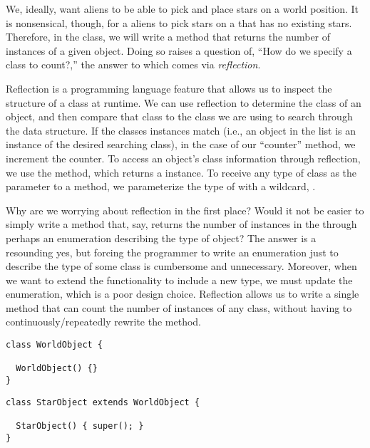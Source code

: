 We, ideally, want aliens to be able to pick and place stars on a world position. It is nonsensical, though, for a aliens to pick stars on a  that has no existing stars. Therefore, in the  class, we will write a method that returns the number of instances of a given object. Doing so raises a question of, ``How do we specify a class to count?,'' the answer to which comes via \emph{reflection}. 

Reflection is a programming language feature that allows us to inspect the structure of a class at runtime. We can use reflection to determine the class of an object, and then compare that class to the class we are using to search through the data structure. If the classes instances match (i.e., an object in the list is an instance of the desired searching class), in the case of our ``counter'' method, we increment the counter. To access an object's class information through reflection, we use the  method, which returns a  instance. To receive any type of class as the parameter to a method, we parameterize the type of  with a wildcard, .

Why are we worrying about reflection in the first place? Would it not be easier to simply write a method that, say, returns the number of  instances in the  through perhaps an enumeration describing the type of object? The answer is a resounding yes, but forcing the programmer to write an enumeration just to describe the type of some class is cumbersome and unnecessary. Moreover, when we want to extend the functionality to include a new type, we must update the enumeration, which is a poor design choice. Reflection allows us to write a single method that can count the number of instances of any class, without having to continuously/repeatedly rewrite the method.

\begin{lstlisting}[language=MyJava]
class WorldObject {

  WorldObject() {}
}
\end{lstlisting}

\enlargethispage{3\baselineskip}
\begin{lstlisting}[language=MyJava]
class StarObject extends WorldObject {
  
  StarObject() { super(); }
}
\end{lstlisting}


